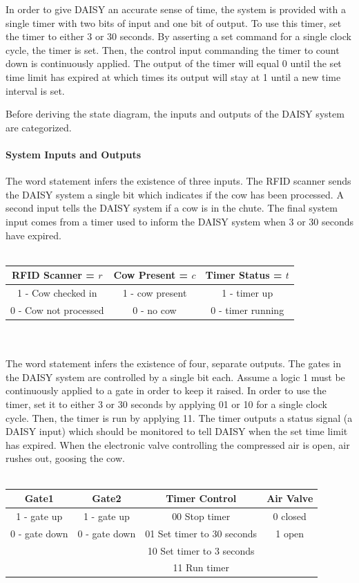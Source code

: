 In order to give DAISY an accurate sense of time, the system is
provided with a single timer with two bits of input and one bit of
output.  To use this timer, set the timer to either 3 or
30 seconds.  By asserting a set command for a single
clock cycle, the timer is set.  Then, the control input commanding the timer to count
down is continuously applied.  The output of the timer will equal
0 until the set time limit has expired at which times its output
will stay at 1 until a new time interval is set.

Before deriving the state diagram, the inputs and outputs of
the DAISY system are categorized.

\paragraph{System Inputs and Outputs}
The word statement infers the existence of three inputs.  The RFID
scanner sends the DAISY system a single bit which indicates if the cow has been
processed.  A second input tells the DAISY system if a cow is in
the chute. The final system input comes from a timer used
to inform the DAISY system when 3 or 30 seconds have expired.
\\ \\
\begin{tabular}{c|c|c}
    RFID Scanner = $r$    & Cow Present = $c$    & Timer Status = $t$    \\ \hline \hline
    1 - Cow checked in    & 1 - cow present    & 1 - timer up        \\ \hline
    0 - Cow not processed    & 0 - no cow        & 0 - timer running    \\
\end{tabular}
\\ \\
The word statement infers the existence of four, separate outputs.  The gates in the
DAISY system are controlled by a single bit each.  Assume
a logic 1 must be continuously applied to a gate in order to keep it raised. In order
to use the timer, set it to either 3 or 30 seconds by applying 01 or
10 for a single clock cycle.  Then, the timer is run by applying 11.  The timer
outputs a status signal (a DAISY input) which should be monitored to tell
DAISY when the set time limit has expired.  When the electronic valve
controlling the compressed air is open, air rushes out, goosing the cow.
\\ \\
\begin{tabular}{c|c|c|c}
    Gate1        & Gate2        & Timer Control            & Air Valve    \\ \hline \hline
    1 - gate up     & 1 - gate up    & 00 Stop timer            & 0 closed    \\ \hline
    0 - gate down    & 0 - gate down    & 01 Set timer to 30 seconds    & 1 open    \\ \hline
    &        & 10 Set timer to 3 seconds    &        \\ \hline
    &        & 11 Run timer            &        \\
\end{tabular}

